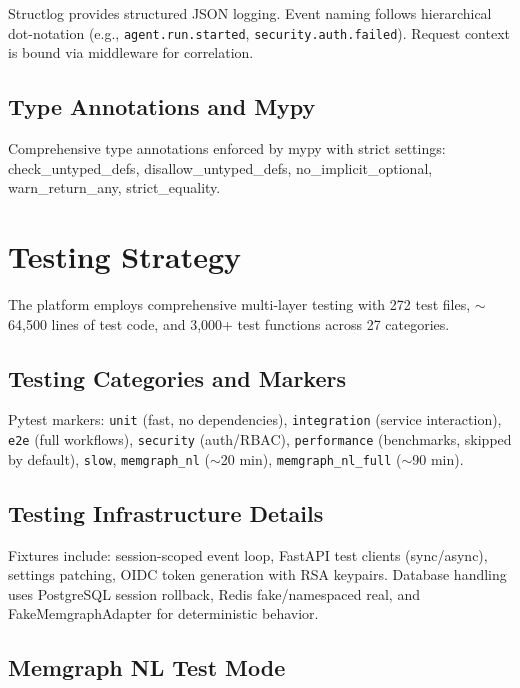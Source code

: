 \documentclass[a4paper,twoside]{sapthesis}
\begin{document}
Structlog provides structured JSON logging. Event naming follows hierarchical dot-notation (e.g., \texttt{agent.run.started}, \texttt{security.auth.failed}). Request context is bound via middleware for correlation.

\subsection{Type Annotations and Mypy}

Comprehensive type annotations enforced by mypy with strict settings: check\_untyped\_defs, disallow\_untyped\_defs, no\_implicit\_optional, warn\_return\_any, strict\_equality.

\section{Testing Strategy}
\label{sec:testing}

The platform employs comprehensive multi-layer testing with 272 test files, $\sim$64,500 lines of test code, and 3,000+ test functions across 27 categories.

\subsection{Testing Categories and Markers}

Pytest markers: \texttt{unit} (fast, no dependencies), \texttt{integration} (service interaction), \texttt{e2e} (full workflows), \texttt{security} (auth/RBAC), \texttt{performance} (benchmarks, skipped by default), \texttt{slow}, \texttt{memgraph\_nl} ($\sim$20 min), \texttt{memgraph\_nl\_full} ($\sim$90 min).

\subsection{Testing Infrastructure Details}
\label{subsec:testing-infrastructure}

Fixtures include: session-scoped event loop, FastAPI test clients (sync/async), settings patching, OIDC token generation with RSA keypairs. Database handling uses PostgreSQL session rollback, Redis fake/namespaced real, and FakeMemgraphAdapter for deterministic behavior.

\subsection{Memgraph NL Test Mode}
\label{subsec:memgraph-nl-test-mode}
\end{document}
